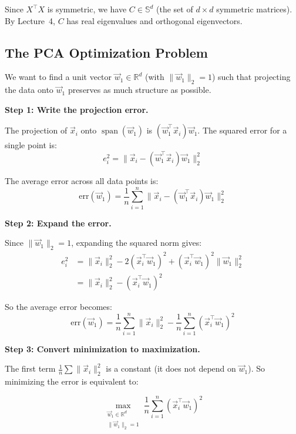 \documentclass[10pt, twocolumn]{article}
\theoremstyle{definition}
\theoremstyle{plain}
\newcommand{\RR}{\mathbb{R}}
\DeclareMathOperator{\spn}{span}
\begin{document}
Since $X^\top X$ is symmetric, we have $C \in \mathbb{S}^d$ (the set of $d \times d$ symmetric matrices). By Lecture~4, $C$ has real eigenvalues and orthogonal eigenvectors.

\subsection{The PCA Optimization Problem}

We want to find a unit vector $\vec{w}_1 \in \RR^d$ (with $\|\vec{w}_1\|_2 = 1$) such that projecting the data onto $\vec{w}_1$ preserves as much structure as possible.

\textbf{Step 1: Write the projection error.}

The projection of $\vec{x}_i$ onto $\spn(\vec{w}_1)$ is $(\vec{w}_1^\top \vec{x}_i)\vec{w}_1$. The squared error for a single point is:
\[
    e_i^2 = \|\vec{x}_i - (\vec{w}_1^\top \vec{x}_i)\vec{w}_1\|_2^2
\]

The average error across all data points is:
\[
    \text{err}(\vec{w}_1) = \frac{1}{n} \sum_{i=1}^{n} \|\vec{x}_i - (\vec{w}_1^\top \vec{x}_i)\vec{w}_1\|_2^2
\]

\textbf{Step 2: Expand the error.}

Since $\|\vec{w}_1\|_2 = 1$, expanding the squared norm gives:
\begin{align*}
    e_i^2 &= \|\vec{x}_i\|_2^2 - 2(\vec{x}_i^\top \vec{w}_1)^2 + (\vec{x}_i^\top \vec{w}_1)^2 \|\vec{w}_1\|_2^2 \\
    &= \|\vec{x}_i\|_2^2 - (\vec{x}_i^\top \vec{w}_1)^2
\end{align*}

So the average error becomes:
\[
    \text{err}(\vec{w}_1) = \frac{1}{n} \sum_{i=1}^{n} \|\vec{x}_i\|_2^2 - \frac{1}{n} \sum_{i=1}^{n} (\vec{x}_i^\top \vec{w}_1)^2
\]

\textbf{Step 3: Convert minimization to maximization.}

The first term $\frac{1}{n}\sum \|\vec{x}_i\|_2^2$ is a constant (it does not depend on $\vec{w}_1$). So minimizing the error is equivalent to:
\begin{result}
\[
    \max_{\substack{\vec{w}_1 \in \RR^d \\ \|\vec{w}_1\|_2 = 1}} \frac{1}{n} \sum_{i=1}^{n} (\vec{x}_i^\top \vec{w}_1)^2
\]
\end{result}
\end{document}
